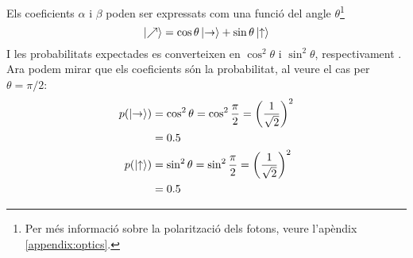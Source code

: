 Els coeficients $\alpha$ i $\beta$ poden ser expressats com una funció del angle $\theta$\footnote{Per més informació sobre la polarització dels fotons, veure l'apèndix \ref{appendix:optics}.}
\begin{equation}
	\ket{\nearrow} = \cos\theta\ket{\text{\textrightarrow}} + \sin\theta\ket{\text{\textuparrow}}
	\label{eq:photon_state}
\end{equation}
I les probabilitats expectades es converteixen en $\cos^2\theta$ i $\sin^2\theta$, respectivament \cite{QC_intro:photon}. Ara podem mirar que els coeficients són la probabilitat, al veure el cas per $\theta = \pi/2$:
\begin{align*}
	p(\ket{\text{\textrightarrow}}) &= \cos^2\theta 
	= \cos^2 \frac{\pi}{2}
	= \left( \frac{1}{\sqrt{2}} \right) ^2 \\
	&= 0.5 \\
	p(\ket{\text{\textuparrow}}) &= \sin^2\theta 
	= \sin^2 \frac{\pi}{2}
	= \left( \frac{1}{\sqrt{2}} \right) ^2 \\
	&= 0.5 \\	
\end{align*} 
